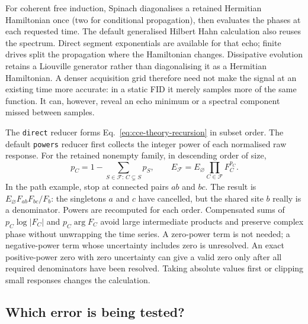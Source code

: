 \documentclass[11pt,a4paper]{article}
\newcommand{\code}[1]{\texttt{#1}}
\begin{document}
For coherent free induction, Spinach diagonalises a retained Hermitian
Hamiltonian once (two for conditional propagation), then evaluates the
phases at each requested time. The default generalised Hilbert Hahn
calculation also reuses the spectrum. Direct segment exponentials are
available for that echo; finite drives split the propagation where the
Hamiltonian changes. Dissipative evolution retains a Liouville generator
rather than diagonalising it as a Hermitian Hamiltonian. A denser
acquisition grid therefore need not make the signal at an existing time
more accurate: in a static FID it merely samples more of the same
function. It can, however, reveal an echo minimum or a spectral component
missed between samples.

The \code{direct} reducer forms Eq.~\eqref{eq:cce-theory-recursion} in
subset order. The default \code{powers} reducer first collects the
integer power of each normalised raw response. For the retained nonempty
family, in descending order of size,
\begin{equation}
 p_C=1-\sum_{S\in\mathcal F:\,C\subsetneq S}p_S,\qquad
 E_{\mathcal F}=E_\varnothing\prod_{C\in\mathcal F}F_C^{p_C}.
 \label{eq:cce-numerics-powers}
\end{equation}
In the path example, stop at connected pairs $ab$ and $bc$. The result
is $E_\varnothing F_{ab}F_{bc}/F_b$: the singletons $a$ and $c$ have
cancelled, but the shared site $b$ really is a denominator. Powers are
recomputed for each order. Compensated sums of $p_C\log|F_C|$ and
$p_C\arg F_C$ avoid large intermediate products and preserve complex
phase without unwrapping the time series. A zero-power term is not
needed; a negative-power term whose uncertainty includes zero is
unresolved. An exact positive-power zero with zero uncertainty can give
a valid zero only after all required denominators have been resolved.
Taking absolute values first or clipping small responses changes the
calculation.

\subsection{Which error is being tested?}
\end{document}
